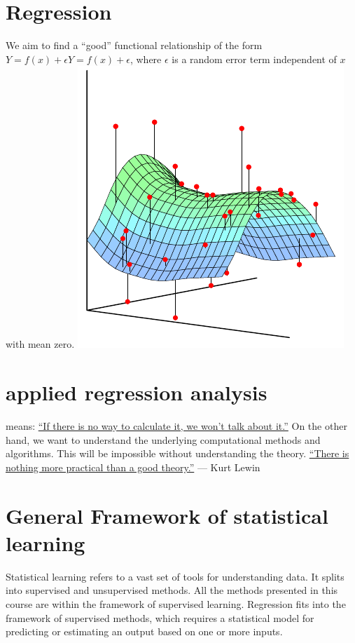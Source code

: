 \documentclass[11pt]{article}
\begin{document}
\section{Regression}\label{sec:Regression}
We aim to find a ``good'' functional relationship of the form $Y=f(x)+\epsilon Y = f(x) + \epsilon$, where $\epsilon$ is a random error term independent of $x$ with mean zero.
\includegraphics{figure-1-1-1}
\blindtext

\section{applied regression analysis}\label{sec:applied regression analysis}
 means: \underline{``If there is no way to calculate it, we won't talk about it.''}
On the other hand, we want to understand the underlying computational methods and algorithms.
This will be impossible without understanding the theory.
\underline{``There is nothing more practical than a good theory.''}
— Kurt Lewin
\blindtext

\section{General Framework of statistical learning}\label{sec:General-framework-of-statistical-learning}
Statistical learning refers to a vast set of tools for understanding data.
It splits into supervised and unsupervised methods.
All the methods presented in this course are within the framework of supervised learning.
Regression fits into the framework of supervised methods, which requires a statistical model for predicting or estimating an output based on one or more inputs.
\end{document}

